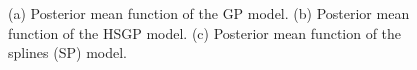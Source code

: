 \documentclass[]{interact}
\theoremstyle{plain}%
\theoremstyle{definition}
\theoremstyle{remark}
\begin{document}
\begin{figure}
\caption{(a) Posterior mean function of the GP model. (b) Posterior mean function of the HSGP model. (c) Posterior mean function of the splines (SP) model.}
  \label{fig18_gpfun_diabetes}
\end{figure}
\end{document}
